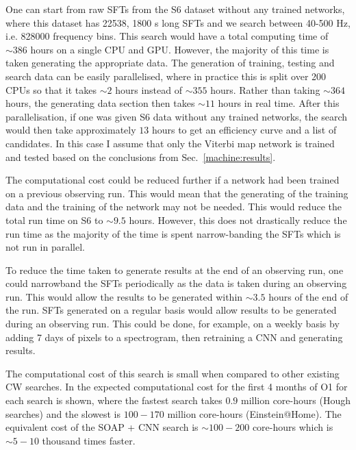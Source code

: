 %
One can start from raw \glspl{SFT} from the S6 dataset without any trained networks, where this dataset has 22538, 1800 s long \glspl{SFT} and we search between 40-500 Hz, i.e. 828000 frequency bins. 
This search would have a total computing time of $ \sim 386$ hours on a single \gls{CPU} and \gls{GPU}.
However, the majority of this time is taken generating the appropriate data.
The generation of training, testing and search data can be easily parallelised, where in practice this is split over 200 \glspl{CPU} so that it takes $\sim 2$ hours instead of $\sim 355$ hours. 
Rather than taking $\sim 364$ hours, the generating data section then takes $\sim 11$ hours in real time.
After this parallelisation, if one was given S6 data without any trained networks, the search would then take approximately $13$ hours to get an efficiency curve and a list of candidates. In this case I assume that only the Viterbi map network is trained and tested based on the conclusions from Sec.~\ref{machine:results}. 

The computational cost could be reduced further if a network had been trained on a previous observing run. 
This would mean that the generating of the training data and the training of the network may not be needed.
This would reduce the total run time on S6 to $\sim 9.5$ hours. 
However, this does not drastically reduce the run time as the majority of the time is spent narrow-banding the \glspl{SFT} which is not run in parallel.

To reduce the time taken to generate results at the end of an observing run, one could narrowband the \glspl{SFT} periodically as the data is taken during an observing run. 
This would allow the results to be generated within $\sim 3.5$ hours of the end of the run.
\glspl{SFT} generated on a regular basis would allow results to be generated during an observing run.
This could be done, for example, on a weekly basis by adding 7 days of pixels to a spectrogram, then retraining a \gls{CNN} and generating results.

The computational cost of this search is small when compared to other existing \gls{CW} searches. In \cite{walsh2016ComparisonMethods} the expected computational cost for the first 4 months of O1 for each search is shown, where the fastest search takes $0.9$ million core-hours (Hough searches) and the slowest is $100-170$ million core-hours (Einstein@Home).
The equivalent cost of the SOAP + \gls{CNN} search is $\sim 100-200$ core-hours which is $\sim 5-10$ thousand times faster.

